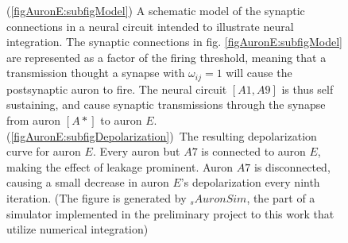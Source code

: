 \begin{figure} %
    \centering
    \caption{ %
			(\ref{figAuronE:subfigModel}) A schematic model of the synaptic connections in a neural circuit intended to illustrate neural integration.
			The synaptic connections in fig. \ref{figAuronE:subfigModel} are represented as a factor of the firing threshold, meaning that a transmission thought a synapse with $\omega_{ij}=1$ will cause the postsynaptic auron to fire.
			The neural circuit $[A1, A9]$ is thus self sustaining, and cause synaptic transmissions through the synapse from auron $[A*]$ to auron $E$.
			\mbox{(\ref{figAuronE:subfigDepolarization}) The} resulting depolarization curve for auron $E$.
			Every auron but $A7$ is connected to auron $E$, making the effect of leakage prominent.
			Auron $A7$ is disconnected, causing a small decrease in auron $E$'s depolarization every ninth iteration.
			(The figure is generated by \emph{$_s{AuronSim}$}, the part of a simulator implemented in the preliminary project to this work that utilize numerical integration) 
				}
    \label{figExperiment2}
\end{figure}


